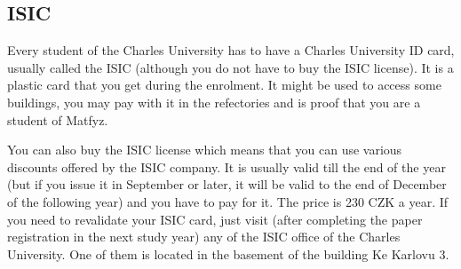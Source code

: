\subsection{ISIC}
Every student of the Charles University has to have a Charles University ID
card, usually called the ISIC (although you do not have to buy the ISIC
license).
It is a plastic card that you get during the enrolment. It might be used to
access some buildings, you may pay with it in the refectories and is proof
that you are a student of Matfyz.

You can also buy the ISIC license which means that you can use various discounts
offered by the ISIC company. It is usually valid till the end of the year (but
if you issue it in September or later, it will be valid to the end of December
of the following year) and you have to pay for it. The price is 230 CZK a year.
If you need to revalidate your ISIC card, just visit (after completing the paper
registration in the next study year) any of the ISIC office of the Charles
University. One of them is located in the basement of the building Ke Karlovu 3.